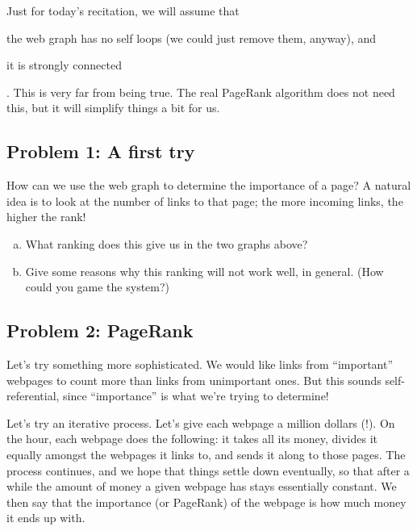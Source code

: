 \documentclass[11pt]{article}
\begin{document}
Just for today's recitation, we will assume that \begin{inparaenum}[(i)] \item the web graph has no self loops (we could just remove them, anyway), and \item it is strongly connected\end{inparaenum}. This is very far from being true. The real PageRank algorithm does not need this, but it will simplify things a bit for us.

\subsection*{Problem 1: A first try}

How can we use the web graph to determine the importance of a page? A natural idea is to look at the number of links to that page; the more incoming links, the higher the rank! 

\begin{enumerate}[(a)]
    \item What ranking does this give us in the two graphs above?
    \item Give some reasons why this ranking will not work well, in general. (How could you game the system?)
\end{enumerate}

\subsection*{Problem 2: PageRank}

Let's try something more sophisticated. We would like links from ``important'' webpages to count more than links from unimportant ones. But this sounds self-referential, since ``importance'' is what we're trying to determine!

Let's try an iterative process.
Let's give each webpage a million dollars (!). On the hour, each webpage does the following: it takes all its money, divides it equally amongst the webpages it links to, and sends it along to those pages. The process continues, and we hope that things settle down eventually, so that after a while the amount of money a given webpage has stays essentially constant. We then say that the importance (or PageRank) of the webpage is how much money it ends up with.
\begin{center}
\end{center}
\end{document}
